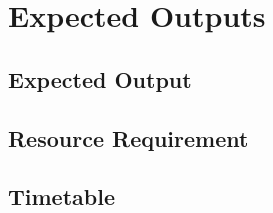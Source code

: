 \chapter{Expected Outputs}

\section{Expected Output}

\section{Resource Requirement}

\section{Timetable}